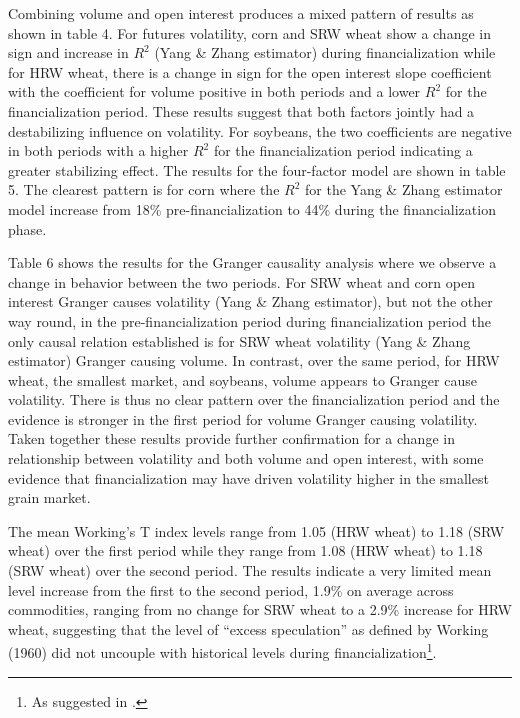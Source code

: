 \documentclass[12pt,]{article}
\let\rmarkdownfootnote\footnote%
\def\footnote{\protect\rmarkdownfootnote}
\begin{document}
Combining volume and open interest produces a mixed pattern of results
as shown in table 4. For futures volatility, corn and SRW wheat show a
change in sign and increase in \(R^{2}\) (Yang \& Zhang estimator)
during financialization while for HRW wheat, there is a change in sign
for the open interest slope coefficient with the coefficient for volume
positive in both periods and a lower \(R^{2}\) for the financialization
period. These results suggest that both factors jointly had a
destabilizing influence on volatility. For soybeans, the two
coefficients are negative in both periods with a higher \(R^{2}\) for
the financialization period indicating a greater stabilizing effect. The
results for the four-factor model are shown in table 5. The clearest
pattern is for corn where the \(R^{2}\) for the Yang \& Zhang estimator
model increase from 18\% pre-financialization to 44\% during the
financialization phase.

Table 6 shows the results for the Granger causality analysis where we
observe a change in behavior between the two periods. For SRW wheat and
corn open interest Granger causes volatility (Yang \& Zhang estimator),
but not the other way round, in the pre-financialization period during
financialization period the only causal relation established is for SRW
wheat volatility (Yang \& Zhang estimator) Granger causing volume. In
contrast, over the same period, for HRW wheat, the smallest market, and
soybeans, volume appears to Granger cause volatility. There is thus no
clear pattern over the financialization period and the evidence is
stronger in the first period for volume Granger causing volatility.
Taken together these results provide further confirmation for a change
in relationship between volatility and both volume and open interest,
with some evidence that financialization may have driven volatility
higher in the smallest grain market.

The mean Working's T index levels range from 1.05 (HRW wheat) to 1.18
(SRW wheat) over the first period while they range from 1.08 (HRW wheat)
to 1.18 (SRW wheat) over the second period. The results indicate a very
limited mean level increase from the first to the second period, 1.9\%
on average across commodities, ranging from no change for SRW wheat to a
2.9\% increase for HRW wheat, suggesting that the level of ``excess
speculation'' as defined by Working (1960) did not uncouple with
historical levels during financialization\footnote{As suggested in
  \citet{sanders_speculative_2010}.}.
\end{document}
